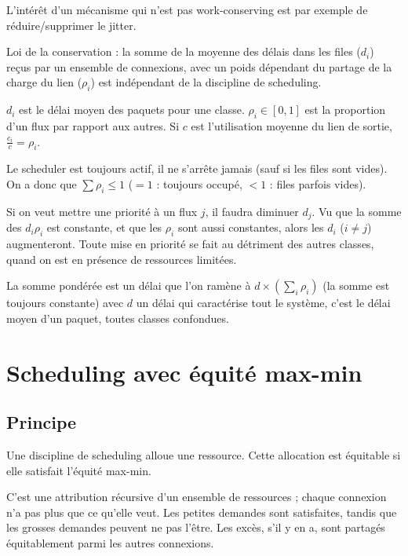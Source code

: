 			L'intérêt d'un mécanisme qui n'est pas work-conserving est par exemple de réduire/supprimer le jitter.
			
			Loi de la conservation : la somme de la moyenne des délais dans les files ($d_i$) reçus par un ensemble de connexions, avec un poids dépendant du partage de la charge du lien ($\rho_i$) est indépendant de la discipline de scheduling.
			
			$d_i$ est le délai moyen des paquets pour une classe. $\rho_i \in [0, 1]$ est la proportion d'un flux par rapport aux autres. Si $c$ est l'utilisation moyenne du lien de sortie, $\frac{c_i}{c} = \rho_i$.
			
		
			Le scheduler est toujours actif, il ne s'arrête jamais (sauf si les files sont vides). On a donc que $\sum \rho_i \leq 1$ ($= 1$ : toujours occupé, $< 1$ : files parfois vides).
		
			Si on veut mettre une priorité à un flux $j$, il faudra diminuer $d_j$. Vu que la somme des $d_i \rho_i$ est constante, et que les $\rho_i$ sont aussi constantes, alors les $d_i$ ($i \neq j$) augmenteront. Toute mise en priorité se fait au détriment des autres classes, quand on est en présence de ressources limitées.
		
			La somme pondérée est un délai que l'on ramène à $d \times (\sum_i \rho_i)$ (la somme est toujours constante) avec $d$ un délai qui caractérise tout le système, c'est le délai moyen d'un paquet, toutes classes confondues.
		
		
			\section{Scheduling avec équité max-min}
			
			\subsection{Principe}
			Une discipline de scheduling alloue une ressource. Cette allocation est équitable si elle satisfait l'équité max-min.
			
			C'est une attribution récursive d'un ensemble de ressources ; chaque connexion n'a pas plus que ce qu'elle veut. Les petites demandes sont satisfaites, tandis que les grosses demandes peuvent ne pas l'être. Les excès, s'il y en a, sont partagés équitablement parmi les autres connexions.
			
			
